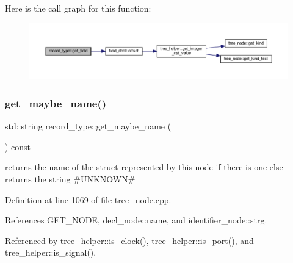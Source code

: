 Here is the call graph for this function\+:
\nopagebreak
\begin{figure}[H]
\begin{center}
\leavevmode
\includegraphics[width=350pt]{d9/d8f/structrecord__type_a5ff87a2eae46bb0cf9981f21987cbde0_cgraph}
\end{center}
\end{figure}
\mbox{\label{structrecord__type_abcdb0f23b59997c989a65668950b8d5c}} 
\subsubsection{\texorpdfstring{get\+\_\+maybe\+\_\+name()}{get\_maybe\_name()}}
{\footnotesize\ttfamily std\+::string record\+\_\+type\+::get\+\_\+maybe\+\_\+name (\begin{DoxyParamCaption}{ }\end{DoxyParamCaption}) const}



returns the name of the struct represented by this node if there is one else returns the string \#U\+N\+K\+N\+O\+WN\# 



Definition at line 1069 of file tree\+\_\+node.\+cpp.



References G\+E\+T\+\_\+\+N\+O\+DE, decl\+\_\+node\+::name, and identifier\+\_\+node\+::strg.



Referenced by tree\+\_\+helper\+::is\+\_\+clock(), tree\+\_\+helper\+::is\+\_\+port(), and tree\+\_\+helper\+::is\+\_\+signal().

